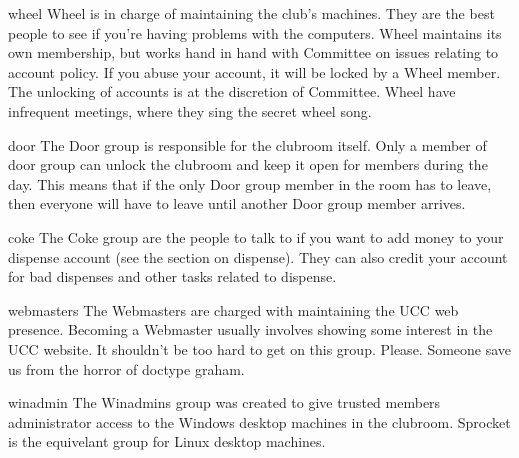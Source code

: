 \begin{uccgroup}{wheel}
Wheel is in charge of maintaining the club's machines. They are the best people to see if you're having problems with the computers. Wheel maintains its own membership, but works hand in hand with Committee on issues relating to account policy. If you abuse your account, it will be locked by a Wheel member. The unlocking of accounts is at the discretion of Committee. Wheel have infrequent meetings, where they sing the secret wheel song. %
\end{uccgroup}

\begin{uccgroup}{door}
The Door group is responsible for the clubroom itself. Only a member of door group can unlock the clubroom and keep it open for members during the day. This means that if the only Door group member in the room has to leave, then everyone will have to leave until another Door group member arrives.
\end{uccgroup}

\begin{uccgroup}{coke}
The Coke group are the people to talk to if you want to add money to your dispense account (see the section on dispense). They can also credit your account for bad dispenses and other tasks related to dispense.
\end{uccgroup}

\begin{uccgroup}{webmasters}
The Webmasters are charged with maintaining the UCC web presence. Becoming a Webmaster usually involves showing some interest in the UCC website. It shouldn't be too hard to get on this group.
 Please. Someone save us from the horror of doctype graham.
\end{uccgroup}

\begin{uccgroup}{winadmin}
The Winadmins group was created to give trusted members administrator access to the Windows desktop machines in the clubroom. Sprocket is the equivelant group for Linux desktop machines.
\end{uccgroup}






